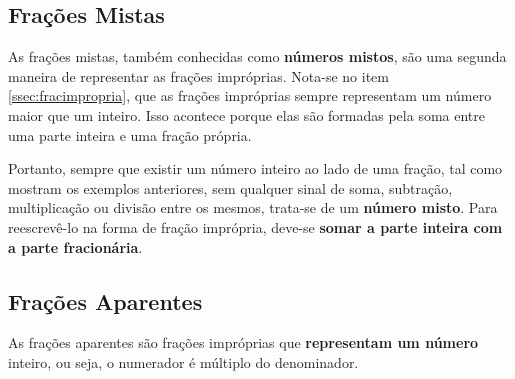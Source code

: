         \begin{texample}
        \centering
        \end{texample}
        
	\subsection{Frações Mistas}
	As frações mistas, também conhecidas como \textbf{números mistos}, são uma segunda maneira de representar as frações impróprias. Nota-se no item \ref{ssec:fracimpropria}, que  as frações impróprias sempre representam um número maior que um inteiro. Isso acontece porque elas são formadas pela soma entre uma parte inteira e uma fração própria.

        \begin{texample}
        \centering
        \end{texample}
        	
	Portanto, sempre que existir um número inteiro ao lado de uma fração, tal como mostram os exemplos  anteriores, sem qualquer sinal de soma, subtração, multiplicação ou divisão entre os mesmos, trata-se de um \textbf{número misto}. Para reescrevê-lo na forma de fração imprópria, deve-se \textbf{somar a parte inteira com a parte fracionária}.

        \begin{texample}
        \centering
        \end{texample}
	
	\subsection{Frações Aparentes}
	As frações aparentes são frações impróprias que \textbf{representam um número} inteiro, ou seja, o numerador é múltiplo do denominador.
        \begin{texample}
        \centering
        \end{texample}
	

